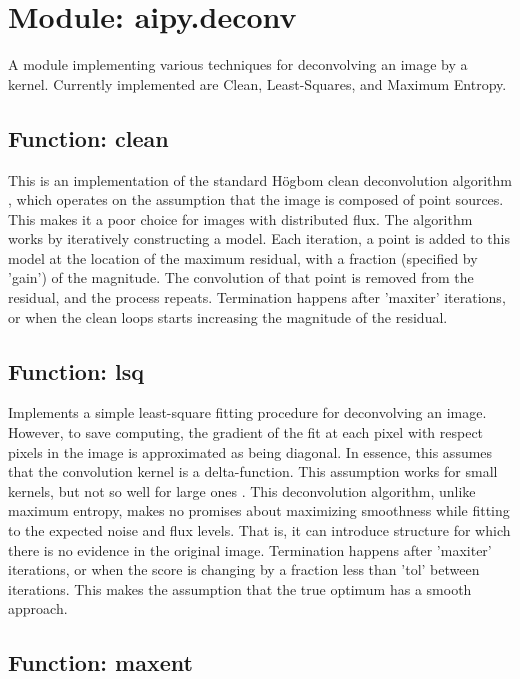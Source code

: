\section{Module: aipy.deconv}

A module implementing various techniques for deconvolving an image by a
kernel.  Currently implemented are Clean, Least-Squares, and Maximum Entropy.

\subsection{Function: clean}

This is an implementation of the standard H{\"o}gbom clean deconvolution
algorithm \cite{hogbom1974}, which operates on the assumption that the image
is composed of point sources.  This makes it a poor choice for images with
distributed flux.  The algorithm works by iteratively constructing a model.
Each iteration, a point is added to this model at the location of the maximum
residual, with a fraction (specified by 'gain') of the magnitude.  The
convolution of that point is removed from the residual, and the process
repeats.  Termination happens after 'maxiter' iterations, or when the clean
loops starts increasing the magnitude of the residual.

\subsection{Function: lsq}

Implements a simple least-square fitting procedure for deconvolving an image.
However, to save computing, the gradient of the fit at each pixel with respect
pixels in the image is approximated as being diagonal.  In essence, this
assumes that the convolution kernel is a delta-function.  This assumption
works for small kernels, but not so well for large ones
\cite{cornwell_evans1985}.  This deconvolution algorithm, unlike maximum
entropy, makes no promises about maximizing smoothness while fitting to the
expected noise and flux levels.  That is, it can introduce structure for which
there is no evidence in the original image.  Termination happens after
'maxiter' iterations, or when the score is changing by a fraction less than
'tol' between iterations.  This makes the assumption that the true optimum has
a smooth approach.

\subsection{Function: maxent}

